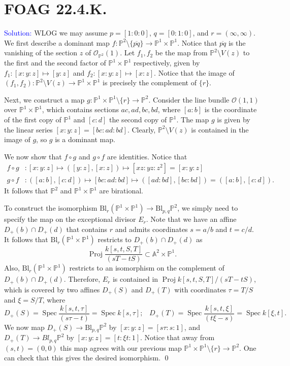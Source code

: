 \documentclass[11pt]{article}
\renewcommand{\AA}{\mathbb{A}}
\newcommand{\PP}{\mathbb{P}}
\newcommand{\cO}{\mathcal{O}}
\DeclareMathOperator{\Spec}{\operatorname{Spec}}
\newcommand{\Proj}{\operatorname{Proj}}
\newcommand{\Bl}{\mathrm{Bl}}
\newenvironment{solution}{\begin{trivlist}\item[]{\textcolor{blue}{Solution:}}}{\qed \end{trivlist}}
\begin{document}
\newpage

\section*{FOAG 22.4.K.}

\begin{solution}
    WLOG we may assume $p = [1:0:0]$, $q = [0:1:0]$, and $r = (\infty, \infty)$. We first describe a dominant map $f: \PP^2 \setminus \{\overline{pq}\} \rightarrow \PP^1 \times \PP^1$. Notice that $\overline{pq}$ is the vanishing of the section $z$ of $\cO_{\PP^2}(1)$. Let $f_1, f_2$ be the map from $\PP^2 \setminus V(z)$ to the first and the second factor of $\PP^1 \times \PP^1$ respectively, given by $f_1: [x:y:z] \mapsto [y:z]$ and $f_2: [x:y:z] \mapsto [x:z]$. Notice that the image of $(f_1, f_2): \PP^2 \setminus V(z) \rightarrow \PP^1 \times \PP^1$ is precisely the complement of $\{r\}$. 

    Next, we construct a map $g: \PP^1 \times \PP^1 \setminus \{r\} \rightarrow \PP^2$. Consider the line bundle $\cO(1, 1)$ over $\PP^1 \times \PP^1$, which contains sections $ac, ad, bc, bd$, where $[a:b]$ is the coordinate of the first copy of $\PP^1$ and $[c:d]$ the second copy of $\PP^1$. The map $g$ is given by the linear series $[x:y:z] = [bc:ad:bd]$. Clearly, $\PP^2 \setminus V(z)$ is contained in the image of $g$, so $g$ is a dominant map. 

    We now show that $f \circ g$ and $g \circ f$ are identities. Notice that 
    \begin{align*}
        f \circ g &: [x:y:z] \mapsto ([y:z], [x:z]) \mapsto [xz:yz:z^2] = [x:y:z] \\
        g \circ f &: ([a:b], [c:d]) \mapsto [bc: ad: bd] \mapsto ([ad:bd], [bc:bd]) = ([a:b], [c:d]).
    \end{align*}
    It follows that $\PP^2$ and $\PP^1 \times \PP^1$ are birational. 

    To construct the isomorphism $\Bl_r (\PP^1 \times \PP^1) \rightarrow \Bl_{p,q} \PP^2$, we simply need to specify the map on the exceptional divisor $E_r$. Note that we have an affine $D_+(b) \cap D_+(d)$ that contains $r$ and admits coordinates $s = a/b$ and $t = c/d$. It follows that $\Bl_r (\PP^1 \times \PP^1)$ restricts to $D_+(b) \cap D_+(d)$ as 
    \[
        \Proj \frac{k[s,t,S,T]}{(sT - tS)} \subset \AA^2 \times \PP^1.
    \]
    Also, $\Bl_r (\PP^1 \times \PP^1)$ restricts to an isomorphism on the complement of $D_+(b) \cap D_+(d)$. Therefore, $E_r$ is contained in $ \Proj k[s,t,S,T]/(sT - tS)$, which is covered by two affines $D_+(S)$ and $D_+(T)$ with coordinates $\tau = T/S$ and $\xi = S/T$, where 
    \[
        D_+(S) = \Spec \frac{k[s,t,\tau]}{(s \tau - t)} = \Spec k[s, \tau] ; \hspace{10pt}
        D_+(T) = \Spec \frac{k[s,t,\xi]}{(t \xi - s)} = \Spec k[\xi, t].
    \]
    We now map $D_+(S) \rightarrow \Bl_{p,q} \PP^2$ by $[x:y:z] = [s\tau : s : 1]$, and $D_+(T) \rightarrow Bl_{p,q} \PP^2$ by $[x:y:z] = [t: \xi t: 1]$. Notice that away from $(s,t) = (0,0)$ this map agrees with our previous map $\PP^1 \times \PP^1 \setminus \{r\} \rightarrow \PP^2$. One can check that this gives the desired isomorphism. 
\end{solution}
\end{document}
